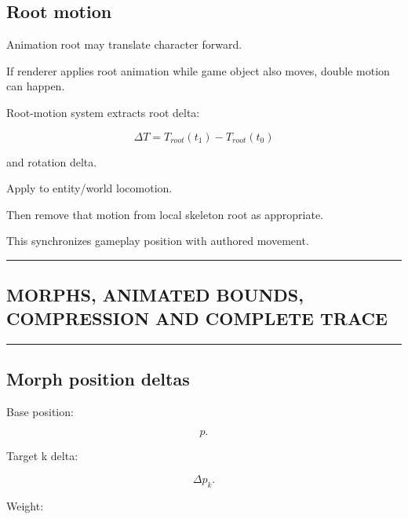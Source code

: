 \subsection{Root motion}\label{04-visual-computing-ii-ch041-root-motion}

\hypertarget{04-visual-computing-ii-ch041-root-motion}{}

Animation root may translate character forward.

If renderer applies root animation while game object also moves, double motion can happen.

Root-motion system extracts root delta:

\[
\Delta T=
T_{root}(t_1)
-
T_{root}(t_0)
\]

and rotation delta.

Apply to entity/world locomotion.

Then remove that motion from local skeleton root as appropriate.

This synchronizes gameplay position with authored movement.

\begin{center}\rule{0.5\linewidth}{0.5pt}\end{center}

\subsection{MORPHS, ANIMATED BOUNDS, COMPRESSION AND COMPLETE TRACE}\label{04-visual-computing-ii-ch041-morphs-animated-bounds-compression-and-complete-trace}

\hypertarget{04-visual-computing-ii-ch041-morphs-animated-bounds-compression-and-complete-trace}{}

\begin{center}\rule{0.5\linewidth}{0.5pt}\end{center}

\subsection{Morph position deltas}\label{04-visual-computing-ii-ch041-morph-position-deltas}

\hypertarget{04-visual-computing-ii-ch041-morph-position-deltas}{}

Base position:

\[
p.
\]

Target k delta:

\[
\Delta p_k.
\]

Weight:

